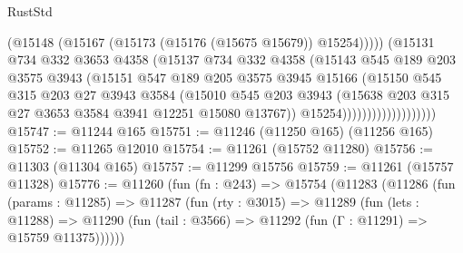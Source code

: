 \begin{lexlean}{RustStd}
\begin{coremodule}
                                    (@15148 (@15167 (@15173 (@15176 (@15675 @15679)) @15254)))))
                                (@15131
                                  @734
                                  @332
                                  @3653
                                  @4358
                                  (@15137
                                    @734
                                    @332
                                    @4358
                                    (@15143
                                      @545
                                      @189
                                      @203
                                      @3575
                                      @3943
                                      (@15151
                                        @547
                                        @189
                                        @205
                                        @3575
                                        @3945
                                        @15166
                                        (@15150
                                          @545
                                          @315
                                          @203
                                          @27
                                          @3943
                                          @3584
                                          (@15010
                                            @545
                                            @203
                                            @3943
                                            (@15638
                                              @203
                                              @315
                                              @27
                                              @3653
                                              @3584
                                              @3941
                                              @12251
                                              @15080
                                              @13767))
                                          @15254)))))))))))))))))))
@15747 := @11244 @165
@15751 := @11246 (@11250 @165) (@11256 @165)
@15752 := @11265 @12010
@15754 := @11261 (@15752 @11280)
@15756 := @11303 (@11304 @165)
@15757 := @11299 @15756
@15759 := @11261 (@15757 @11328)
@15776 := @11260
    (fun (fn : @243) =>
    @15754
      (@11283
        (@11286
          (fun (params : @11285) =>
          @11287
            (fun (rty : @3015) =>
            @11289
              (fun (lets : @11288) =>
              @11290 (fun (tail : @3566) => @11292 (fun (Γ : @11291) => @15759 @11375))))))

\end{coremodule}
\end{lexlean}
